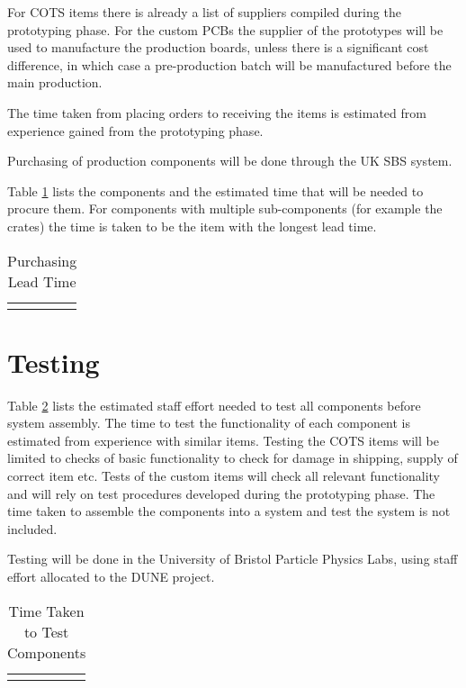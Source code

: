 \documentclass{article}
\begin{document}
For COTS items there is already a list of suppliers compiled during the prototyping phase. For the custom PCBs the supplier of the prototypes will be used to manufacture the production boards, unless there is a significant cost difference, in which case a pre-production batch will be manufactured before the main production.

The time taken from placing orders to receiving the items is estimated from experience gained from the prototyping phase.

Purchasing of production components will be done through the UK SBS system.

Table \ref{tab:dts-component-lead-time} lists the components and the estimated time that will be needed to procure them. For components with multiple sub-components (for example the  crates) the time is taken to be the item with the longest lead time.

\begin{table}[ht]
\begin{tabular}{p{4cm}  |p{2.5cm}| p{2.5cm}| p{2.5cm} }
\end{tabular}
\caption{Purchasing Lead Time}
\label{tab:dts-component-lead-time}
\end{table}

\section{Testing}

Table \ref{tab:dts-component-test-time} lists the estimated staff effort needed to test all components before system assembly. The time to test the functionality of each component is estimated from experience with similar items. Testing the COTS items will be limited to checks of basic functionality to check for damage in shipping, supply of correct item etc. Tests of the custom items will check all relevant functionality and will rely on test procedures developed during the prototyping phase. The time taken to assemble the components into a system and test the system is not included.

Testing will be done in the University of Bristol Particle Physics Labs, using staff effort allocated to the DUNE project.

\begin{table}[h!]
\begin{tabular}{p{6cm}  |p{3.5cm} }
\end{tabular}
\caption{Time Taken to Test Components}
\label{tab:dts-component-test-time}
\end{table}
\end{document}
